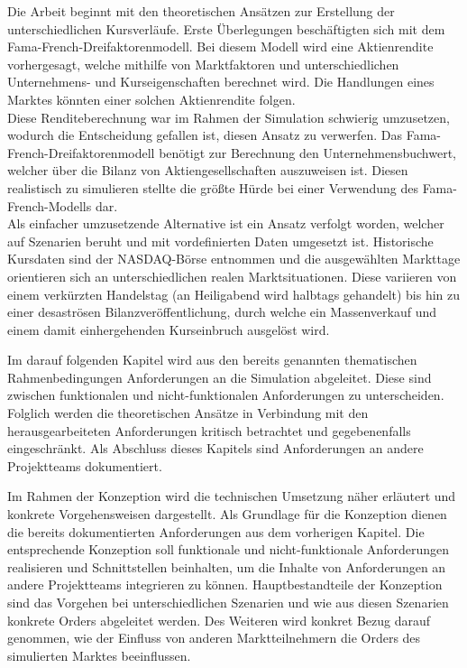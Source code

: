 	
	Die Arbeit beginnt mit den theoretischen Ansätzen zur Erstellung der unterschiedlichen Kursverläufe. Erste Überlegungen beschäftigten sich mit dem Fama-French-Dreifaktorenmodell. Bei diesem Modell wird eine Aktienrendite vorhergesagt, welche mithilfe von Marktfaktoren und unterschiedlichen Unternehmens- und Kurseigenschaften berechnet wird. Die Handlungen eines Marktes könnten einer solchen Aktienrendite folgen.\\
	Diese Renditeberechnung war im Rahmen der Simulation schwierig umzusetzen, wodurch die Entscheidung gefallen ist, diesen Ansatz zu verwerfen. Das Fama-French-Dreifaktorenmodell benötigt zur Berechnung den Unternehmensbuchwert, welcher über die Bilanz von Aktiengesellschaften auszuweisen ist. Diesen realistisch zu simulieren stellte die größte Hürde bei einer Verwendung des Fama-French-Modells dar. \\
	Als einfacher umzusetzende Alternative ist ein Ansatz verfolgt worden, welcher auf Szenarien beruht und mit vordefinierten Daten umgesetzt ist. Historische Kursdaten sind der NASDAQ-Börse entnommen und die ausgewählten Markttage orientieren sich an unterschiedlichen realen Marktsituationen. Diese variieren von einem verkürzten Handelstag (an Heiligabend wird halbtags gehandelt) bis hin zu einer desaströsen Bilanzveröffentlichung, durch welche ein Massenverkauf und einem damit einhergehenden Kurseinbruch ausgelöst wird.
	
	
	Im darauf folgenden Kapitel wird aus den bereits genannten thematischen Rahmenbedingungen Anforderungen an die Simulation abgeleitet. Diese sind zwischen funktionalen und nicht-funktionalen Anforderungen zu unterscheiden. Folglich werden die theoretischen Ansätze in Verbindung mit den herausgearbeiteten Anforderungen kritisch betrachtet und gegebenenfalls eingeschränkt. Als Abschluss dieses Kapitels sind Anforderungen an andere Projektteams dokumentiert.
	
	
	Im Rahmen der Konzeption wird die technischen Umsetzung näher erläutert und konkrete Vorgehensweisen dargestellt. Als Grundlage für die Konzeption dienen die bereits dokumentierten Anforderungen aus dem vorherigen Kapitel. Die entsprechende Konzeption soll funktionale und nicht-funktionale Anforderungen realisieren und Schnittstellen beinhalten, um die Inhalte von Anforderungen an andere Projektteams integrieren zu können. Hauptbestandteile der Konzeption sind das Vorgehen bei unterschiedlichen Szenarien und wie aus diesen Szenarien konkrete Orders abgeleitet werden. Des Weiteren wird konkret Bezug darauf genommen, wie der Einfluss von anderen Marktteilnehmern die Orders des simulierten Marktes beeinflussen.
	
